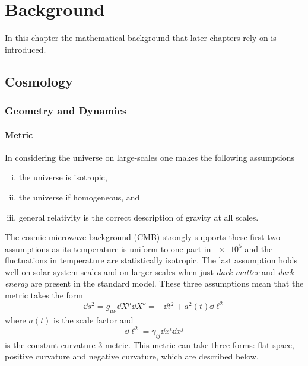 \chapter{Background}\label{sec:chapter2}

In this chapter the mathematical background that later chapters rely on is introduced.

\section{Cosmology}

\subsection{Geometry and Dynamics}

\subsubsection{Metric}

In considering the universe on large-scales one makes the following assumptions
%
\begin{enumerate}[(i),nosep,left=\parindent]
	\item the universe is isotropic,
	\item the universe if homogeneous, and
	\item general relativity is the correct description of gravity at all scales.
\end{enumerate}
%
The cosmic microwave background (CMB) strongly supports these first two assumptions as its temperature is uniform to one part in \(\num{e5}\) and the fluctuations in temperature are statistically isotropic.
The last assumption holds well on solar system scales and on larger scales when just \emph{dark matter} and \emph{dark energy} are present in the standard model.
These three assumptions mean that the metric takes the form
%
\begin{equation}\label{eq:original_metric}
	\dd{s^{2}}
    = g_{\mu\nu} \dd{X^{\mu}} \dd{X^{\nu}}
    = -\dd{t^{2}} + a^{2}(t) \dd{\ell^{2}}
\end{equation}
%
where \(a(t)\) is the scale factor and
%
\begin{equation}
	\dd{\ell^{2}}
    = \gamma_{i j} \dd{x^{i}} \dd{x^{j}}
\end{equation}
%
is the constant curvature 3-metric.
This metric can take three forms: flat space, positive curvature and negative curvature, which are described below.

